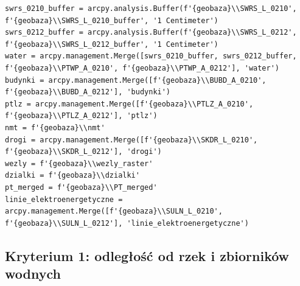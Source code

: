\documentclass{article}
\begin{document}
\begin{lstlisting}
swrs_0210_buffer = arcpy.analysis.Buffer(f'{geobaza}\\SWRS_L_0210', f'{geobaza}\\SWRS_L_0210_buffer', '1 Centimeter')
swrs_0212_buffer = arcpy.analysis.Buffer(f'{geobaza}\\SWRS_L_0212', f'{geobaza}\\SWRS_L_0212_buffer', '1 Centimeter')
water = arcpy.management.Merge([swrs_0210_buffer, swrs_0212_buffer, f'{geobaza}\\PTWP_A_0210', f'{geobaza}\\PTWP_A_0212'], 'water')
budynki = arcpy.management.Merge([f'{geobaza}\\BUBD_A_0210', f'{geobaza}\\BUBD_A_0212'], 'budynki')
ptlz = arcpy.management.Merge([f'{geobaza}\\PTLZ_A_0210', f'{geobaza}\\PTLZ_A_0212'], 'ptlz')
nmt = f'{geobaza}\\nmt'
drogi = arcpy.management.Merge([f'{geobaza}\\SKDR_L_0210', f'{geobaza}\\SKDR_L_0212'], 'drogi')
wezly = f'{geobaza}\\wezly_raster'
dzialki = f'{geobaza}\\dzialki'
pt_merged = f'{geobaza}\\PT_merged'
linie_elektroenergetyczne = arcpy.management.Merge([f'{geobaza}\\SULN_L_0210', f'{geobaza}\\SULN_L_0212'], 'linie_elektroenergetyczne')
\end{lstlisting}

\newpage
\subsection{Kryterium 1: odległość od rzek i zbiorników wodnych}
\end{document}
